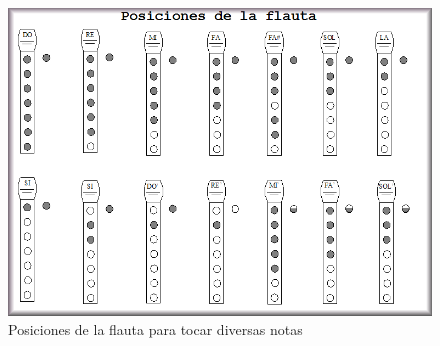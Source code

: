 \begin{figure}[H]
	\begin{center}
		\includegraphics[scale=.35]{img/posiciones_de_la_flauta.png}
		\caption{Posiciones de la flauta para tocar diversas notas}
		\label{fig:tablas}
	\end{center}
\end{figure}

